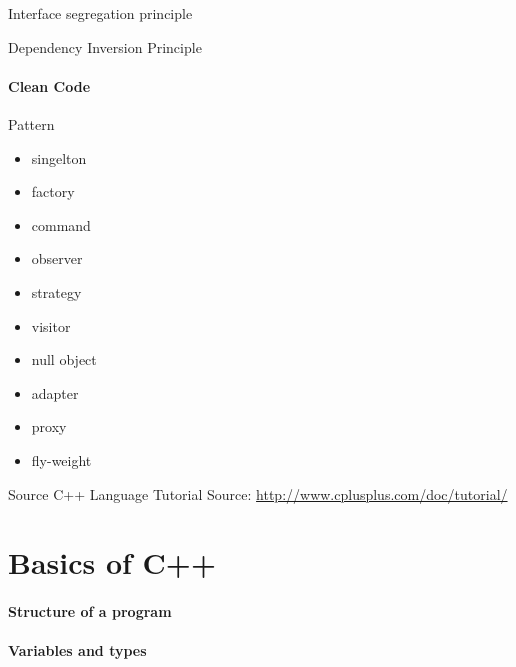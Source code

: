 \documentclass{beamer}
\begin{document}
\begin{frame}{Interface segregation principle}
\end{frame}

\begin{frame}{Dependency Inversion Principle}
\end{frame}

\subsection{Clean Code}


\begin{frame}{Pattern}
\begin{itemize}
  \item singelton
  \item factory
  \item command
  \item observer
  \item strategy
  \item visitor
  \item null object
  \item adapter
  \item proxy
  \item fly-weight
\end{itemize}
\end{frame}


\begin{frame}{Source}
C++ Language Tutorial
Source: \url{http://www.cplusplus.com/doc/tutorial/}
\end{frame}

\part{Basics of C++}
\subsection{Structure of a program}

\subsection{Variables and types}
\end{document}
